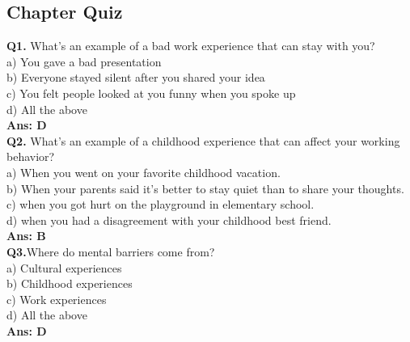 \documentclass[12pt]{article}
\begin{document}
\subsection{Chapter Quiz}
\textbf{Q1.} What's an example of a bad work experience that can stay with you?\\
a) You gave a bad presentation\\
 b) Everyone stayed silent after you shared your idea \\
 c) You felt people looked at you funny when you spoke up\\
 d) All the above\\
\textbf{Ans: D}\\
\textbf{Q2.} What's an example of a childhood experience that can affect your working behavior?\\
a) When you went on your favorite childhood vacation.\\
b) When your parents said it's better to stay quiet than to share your thoughts.\\
c) when you got hurt on the playground in elementary school.\\
d) when you had a disagreement with your childhood best friend.\\
\textbf{Ans: B}\\
\textbf{Q3.}Where do mental barriers come from?\\
a) Cultural experiences \\
b) Childhood experiences \\
c) Work experiences\\
d) All the above\\
\textbf{Ans: D}\\
\end{document}
